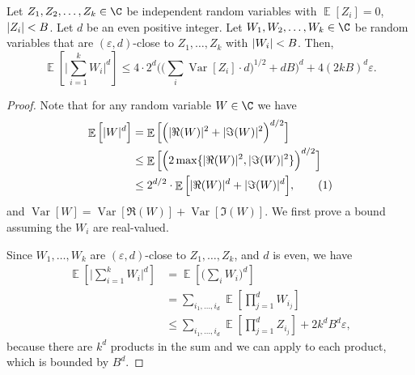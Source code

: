\documentclass{toc}
\def\eps{\varepsilon}
\DeclarePairedDelimiter{\abs}{\lvert}{\rvert}
\DeclareMathOperator*{\E}{\mathbb{E}}                 %
\DeclareMathOperator*{\Var}{Var}                 %
\newcommand\numberthis{\addtocounter{equation}{1}\tag{\theequation}}
\begin{document}
  \begin{lemma} \label{lemma:moments}
    Let $Z_1, Z_2, \ldots, Z_k \in \C$ be independent random variables with $\E[Z_i] = 0$, $\abs{Z_i} < B$.
    Let $d$ be an even positive integer.
    Let $W_1, W_2, \ldots, W_k \in \C$ be random variables that are $(\eps, d)$-close to $Z_1, \ldots, Z_k$ with $\abs{W_i} < B$.
    Then,
    \[
      \E \left[ \Big| \sum_{i = 1}^k W_i \Big|^d \right]
      \le 4 \cdot 2^d \Big( \Big( \sum_i \Var[Z_i] \cdot d \Big)^{1/2} + d B \Big)^d + 4 (2kB)^d \eps.
    \]
  \end{lemma}

  \begin{proof}
    Note that for any random variable $W \in \C$ we have
    \begin{align*}
      \E \Big[ \abs{W}^d \Big]
      &= \E \Big[ \Big( \abs{\Re(W)}^2 + \abs{\Im(W)}^2 \Big)^{d/2} \Big] \\
      &\le \E \Big[ \Big( 2 \max\{ \abs{\Re(W)}^2, \abs{\Im(W)}^2 \} \Big)^{d/2} \Big] \\
      &\le 2^{d/2} \cdot \E \Big[ \abs{\Re(W)}^d + \abs{\Im(W)}^d \Big] , \numberthis \label{eq:complex-decompose}
    \end{align*}
    and $\Var[W] = \Var[\Re(W)] + \Var[\Im(W)]$.  
    We first prove a bound assuming the $W_i$ are real-valued.

    Since $W_1, \ldots, W_k$ are $(\eps, d)$-close to $Z_1, \ldots, Z_k$, and $d$ is even, we have
    \begin{align*}
      \E \left[ \Big| \sum_{i = 1}^k W_i \Big|^d \right]
      &= \E \left[ \Big( \sum_i W_i \Big)^d \right] \\
      &= \sum_{i_1, \ldots, i_d} \E \left[ \prod_{j = 1}^d W_{i_j} \right] \\
      &\le \sum_{i_1, \ldots, i_d} \E \left[ \prod_{j = 1}^d Z_{i_j} \right] + 2 k^d B^d \eps ,
    \end{align*}
    because there are $k^d$ products in the sum and we can apply  to each product, which is bounded by $B^d$.


\end{proof}
\end{document}
